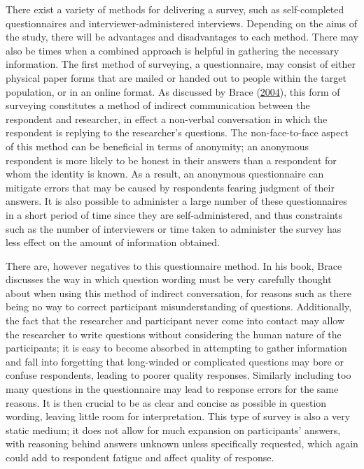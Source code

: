 \documentclass[
  11pt,
]{book}
\begin{document}
There exist a variety of methods for delivering a survey, such as
self-completed questionnaires and interviewer-administered interviews.
Depending on the aims of the study, there will be advantages and
disadvantages to each method. There may also be times when a combined
approach is helpful in gathering the necessary information. The first
method of surveying, a questionnaire, may consist of either physical
paper forms that are mailed or handed out to people within the target
population, or in an online format. As discussed by Brace
(\protect\hyperlink{ref-brace2004}{2004}), this form of surveying
constitutes a method of indirect communication between the respondent
and researcher, in effect a non-verbal conversation in which the
respondent is replying to the researcher's questions. The
non-face-to-face aspect of this method can be beneficial in terms of
anonymity; an anonymous respondent is more likely to be honest in their
answers than a respondent for whom the identity is known. As a result,
an anonymous questionnaire can mitigate errors that may be caused by
respondents fearing judgment of their answers. It is also possible to
administer a large number of these questionnaires in a short period of
time since they are self-administered, and thus constraints such as the
number of interviewers or time taken to administer the survey has less
effect on the amount of information obtained.

There are, however negatives to this questionnaire method. In his book,
Brace discusses the way in which question wording must be very carefully
thought about when using this method of indirect conversation, for
reasons such as there being no way to correct participant
misunderstanding of questions. Additionally, the fact that the
researcher and participant never come into contact may allow the
researcher to write questions without considering the human nature of
the participants; it is easy to become absorbed in attempting to gather
information and fall into forgetting that long-winded or complicated
questions may bore or confuse respondents, leading to poorer quality
responses. Similarly including too many questions in the questionnaire
may lead to response errors for the same reasons. It is then crucial to
be as clear and concise as possible in question wording, leaving little
room for interpretation. This type of survey is also a very static
medium; it does not allow for much expansion on participants' answers,
with reasoning behind answers unknown unless specifically requested,
which again could add to respondent fatigue and affect quality of
response.
\end{document}
